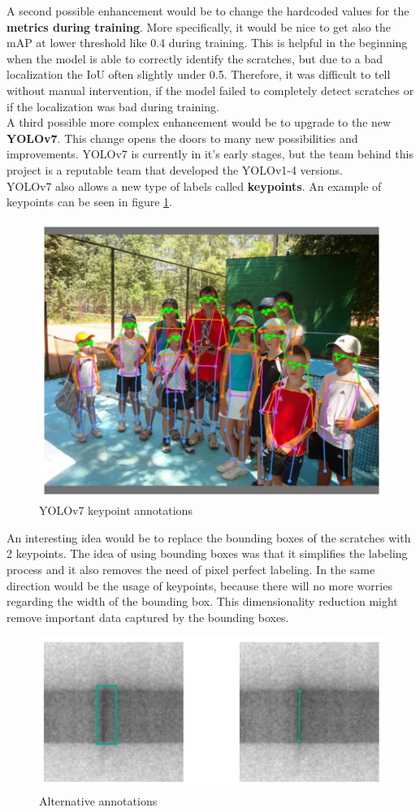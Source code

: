 A second possible enhancement would be to change the hardcoded values for the \textbf{metrics during training}. More specifically, it would be nice to get also the mAP at lower threshold like 0.4 during training. This is helpful in the beginning when the model is able to correctly identify the scratches, but due to a bad localization the IoU often slightly under 0.5. Therefore, it was difficult to tell without manual intervention, if the model failed to completely detect scratches or if the localization was bad during training. \\
A third possible more complex enhancement would be to upgrade to the new \textbf{YOLOv7}. This change opens the doors to many new possibilities and improvements. YOLOv7 is currently in it's early stages, but the team behind this project is a reputable team that developed the YOLOv1-4 versions.\\
 YOLOv7 also allows a new type of labels called \textbf{keypoints}. An example of keypoints can be seen in figure \ref{conc:yolov7_kp_annot}.

 \begin{figure}[!h]
   \centering
   \captionsetup{justification=centering,margin=2cm}
   \includegraphics[width=0.75\columnwidth]{images/conclusions/yolov7_keypoints}
   \caption{YOLOv7 keypoint annotations}
   \label{conc:yolov7_kp_annot}
 \end{figure}

An interesting idea would be to replace the bounding boxes of the scratches with 2 keypoints. The idea of using bounding boxes was that it simplifies the labeling process and it also removes the need of pixel perfect labeling. In the same direction would be the usage of keypoints, because there will no more worries regarding the width of the bounding box. This dimensionality reduction might remove important data captured by the bounding boxes. \\


 \begin{figure}[!h]
   \centering
   \captionsetup{justification=centering,margin=2cm}
   \includegraphics[width=0.75\columnwidth]{images/conclusions/bb_vs_kp_annot}
   \caption{Alternative annotations}
   \label{conc:bb_vs_kp}
 \end{figure}
